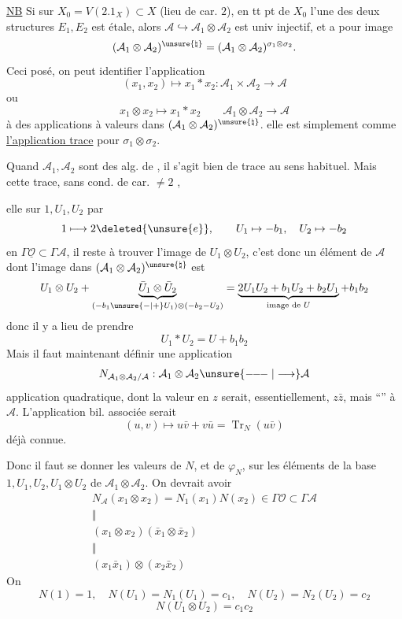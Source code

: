 \uline{NB} Si  sur $X_0=V(2.1_X)\subset X$ (lieu de car. $2$), en tt pt de $X_0$ l'une des deux structures $E_1,E_2$ est étale, alors $\mathcal A\hookrightarrow\mathcal A_1\otimes\mathcal A_2$ est univ injectif, et a pour image
\[
(\mathcal A_1\otimes\mathcal A_2)^{\unsure{\natural}}=(\mathcal A_1\otimes\mathcal A_2)^{\sigma_1\otimes\sigma_2}.
\]
Ceci posé, on peut  identifier l'application
\[
(x_1,x_2)\mapsto x_1*x_2:\mathcal A_1\times\mathcal A_2\longrightarrow\mathcal A
\]
ou
\[
x_1\otimes x_2\mapsto x_1*x_2\qquad \mathcal A_1\otimes\mathcal A_2\longrightarrow\mathcal A
\]
à des applications à valeurs dans $(\mathcal A_1\otimes\mathcal A_2)^{\unsure{\natural}}$.
 elle est simplement  comme \uline{l'application trace} pour $\sigma_1\otimes\sigma_2$.

Quand $\mathcal A_1,\mathcal A_2$ sont des alg. de , il s'agit bien de trace au sens habituel.
Mais cette trace, sans cond. de car. $\ne2$ ,

elle  sur $1,U_1,U_2$ par
\[
1\longmapsto2\deleted{\unsure{e}},\qquad U_1\mapsto-b_1,\quad U_2\mapsto-b_2
\]
 en $\Gamma\underline{\mathcal O}\subset\Gamma\mathcal A$, il reste à trouver l'image de $U_1\otimes U_2$, c'est donc un élément de $\mathcal A$ dont l'image dans $(\mathcal A_1\otimes\mathcal A_2)^{\unsure{\natural}}$ est
\[
U_1\otimes U_2+\underbrace{\bar U_1\otimes\bar U_2}_{(-b_1\unsure{-|+}U_1)\otimes(-b_2-U_2)}=\underbrace{2U_1U_2+b_1U_2+b_2U_1}_{\text{image de }U}+b_1b_2
\]
 donc il y a lieu de prendre
\[
U_1*U_2=U+b_1b_2
\]
Mais il faut maintenant définir une application
\[
N_{\mathcal A_1\otimes\mathcal A_2/\mathcal A}:\mathcal A_1\otimes\mathcal A_2\unsure{\mathrel{-\!\!-\!\!-}|\longrightarrow}\mathcal A
\]
application quadratique, dont la valeur en $z$ serait, essentiellement, $z\bar z$, mais ``'' à $\mathcal A$.
L'application bil. associée serait
\[
(u,v)\longmapsto u\bar v+v\bar u=\operatorname{Tr}_N(u\bar v)
\]
déjà connue.

Donc il faut se donner les  valeurs de $N$, et de $\varphi_N$, sur les éléments de la base $1,U_1,U_2,U_1\otimes U_2$ de $\mathcal A_1\otimes\mathcal A_2$. On devrait avoir
\[
\begin{array}{c}
N_{\mathcal A}(x_1\otimes x_2)=N_1(x_1)N(x_2)\in\Gamma\mathcal O\subset\Gamma\mathcal A\\
\Vert\\
(x_1\otimes x_2)(\bar x_1\otimes\bar x_2)\\
\Vert\\
(x_1\bar x_1)\otimes(x_2\bar x_2)
\end{array}
\]
On 
\[
N(1)=1,\quad N(U_1)=N_1(U_1)=c_1,\quad N(U_2)=N_2(U_2)=c_2
\]
\[
N(U_1\otimes U_2)=c_1c_2
\]

